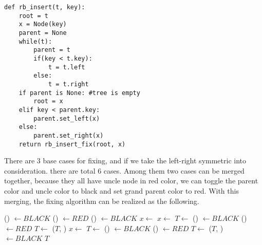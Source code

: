 \documentclass{article}
\begin{document}
\lstset{language=Python}
\begin{lstlisting}
def rb_insert(t, key):
    root = t
    x = Node(key)
    parent = None
    while(t):
        parent = t
        if(key < t.key):
            t = t.left
        else:
            t = t.right
    if parent is None: #tree is empty
        root = x
    elif key < parent.key:
        parent.set_left(x)
    else:
        parent.set_right(x)
    return rb_insert_fix(root, x)
\end{lstlisting}

There are 3 base cases for fixing, and if we take the left-right
symmetric into consideration. there are total 6 cases.
Among them two cases can be merged together, because they all have
uncle node in red color, we can toggle the parent color and
uncle color to black and set grand parent color to red.
With this merging, the fixing algorithm can be realized as the following.

\begin{algorithmic}[1]
      \State {}() $\gets BLACK$
      \State {}() $\gets RED$
      \State {}() $\gets BLACK$
      \State $x \gets$ 
    \Else
          \State $x \gets$ 
          \State $T \gets$ 
        \EndIf
        \State {}() $\gets BLACK$
        \State {}() $\gets RED$
        \State $T \gets$ ($T$, )
      \Else
          \State $x \gets$ 
          \State $T \gets$ 
        \EndIf
        \State {}() $\gets BLACK$
        \State {}() $\gets RED$
        \State $T \gets$ ($T$, )
      \EndIf
    \EndIf
  \EndWhile
  \State {} $\gets BLACK$
  \State \Return $T$
\EndFunction
\end{algorithmic}
\end{document}
